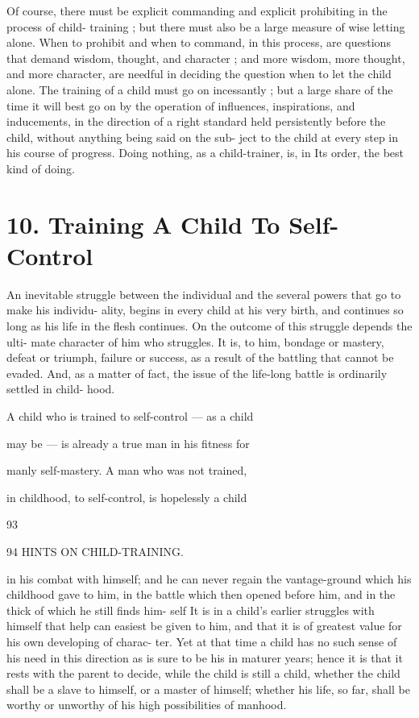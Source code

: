 \documentclass[
]{book}
\begin{document}
Of course, there must be explicit commanding and explicit prohibiting in the process of child- training ; but there must also be a large measure of wise letting alone. When to prohibit and when to command, in this process, are questions that demand wisdom, thought, and character ; and more wisdom, more thought, and more character, are needful in deciding the question when to let the child alone. The training of a child must go on incessantly ; but a large share of the time it will best go on by the operation of influences, inspirations, and inducements, in the direction of a right standard held persistently before the child, without anything being said on the sub- ject to the child at every step in his course of progress. Doing nothing, as a child-trainer, is, in Its order, the best kind of doing.

\hypertarget{training-a-child-to-self-control}{%
\chapter{10. Training A Child To Self-Control}\label{training-a-child-to-self-control}}

An inevitable struggle between the individual and the several powers that go to make his individu- ality, begins in every child at his very birth, and continues so long as his life in the flesh continues. On the outcome of this struggle depends the ulti- mate character of him who struggles. It is, to him, bondage or mastery, defeat or triumph, failure or success, as a result of the battling that cannot be evaded. And, as a matter of fact, the issue of the life-long battle is ordinarily settled in child- hood.

A child who is trained to self-control --- as a child

may be --- is already a true man in his fitness for

manly self-mastery. A man who was not trained,

in childhood, to self-control, is hopelessly a child

93

94 HINTS ON CHILD-TRAINING.

in his combat with himself; and he can never regain the vantage-ground which his childhood gave to him, in the battle which then opened before him, and in the thick of which he still finds him- self It is in a child's earlier struggles with himself that help can easiest be given to him, and that it is of greatest value for his own developing of charac- ter. Yet at that time a child has no such sense of his need in this direction as is sure to be his in maturer years; hence it is that it rests with the parent to decide, while the child is still a child, whether the child shall be a slave to himself, or a master of himself; whether his life, so far, shall be worthy or unworthy of his high possibilities of manhood.
\end{document}
